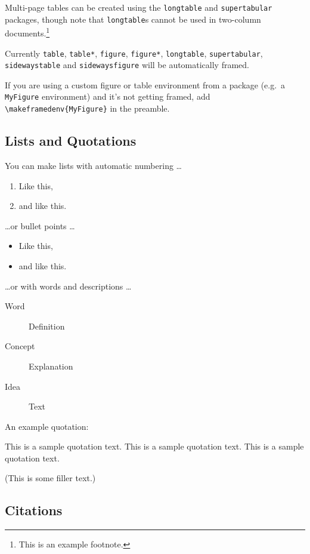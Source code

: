 \documentclass[bibtex,autowc]{apsr_submission}
\begin{document}
Multi-page tables can be created using the \texttt{longtable} and \texttt{supertabular} packages, though note that \texttt{longtable}s cannot be used in two-column documents.\footnote{This is an example footnote. \lipsum[1]}


Currently \texttt{table}, \texttt{table*}, \texttt{figure}, \texttt{figure*}, \texttt{longtable}, \texttt{supertabular}, \texttt{sidewaystable} and \texttt{sidewaysfigure} will be automatically framed.

If you are using a custom figure or table environment from a package (e.g.~a \texttt{MyFigure} environment) and it's not getting framed, add \verb|\makeframedenv{MyFigure}| in the preamble. 

\subsection{Lists and Quotations}

You can make lists with automatic numbering \dots

\begin{enumerate}
\item Like this,
\item and like this.
\end{enumerate}

\dots or bullet points \dots

\begin{itemize} 
\item Like this,
\item and like this.
\end{itemize}

\dots or with words and descriptions \dots

\begin{description}
\item[Word] Definition
\item[Concept] Explanation
\item[Idea] Text
\end{description}

An example quotation:

\begin{quoting}
This is a sample quotation text. This is a sample quotation text. This is a sample quotation text.
\end{quoting}

(This is some filler text.) \lipsum[2]

\subsection{Citations}
\end{document}
